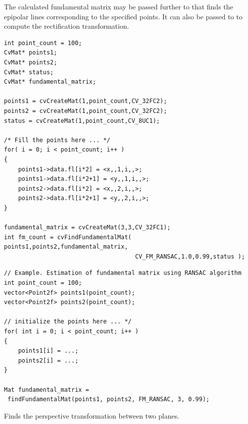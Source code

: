 The calculated fundamental matrix may be passed further to
 that finds the epipolar lines
corresponding to the specified points. It can also be passed to  to compute the rectification transformation.

\ifC
\begin{lstlisting}
int point_count = 100;
CvMat* points1;
CvMat* points2;
CvMat* status;
CvMat* fundamental_matrix;

points1 = cvCreateMat(1,point_count,CV_32FC2);
points2 = cvCreateMat(1,point_count,CV_32FC2);
status = cvCreateMat(1,point_count,CV_8UC1);

/* Fill the points here ... */
for( i = 0; i < point_count; i++ )
{
    points1->data.fl[i*2] = <x,,1,i,,>;
    points1->data.fl[i*2+1] = <y,,1,i,,>;
    points2->data.fl[i*2] = <x,,2,i,,>;
    points2->data.fl[i*2+1] = <y,,2,i,,>;
}

fundamental_matrix = cvCreateMat(3,3,CV_32FC1);
int fm_count = cvFindFundamentalMat( points1,points2,fundamental_matrix,
                                     CV_FM_RANSAC,1.0,0.99,status );
\end{lstlisting}
\fi
\ifCpp
\begin{lstlisting}
// Example. Estimation of fundamental matrix using RANSAC algorithm
int point_count = 100;
vector<Point2f> points1(point_count);
vector<Point2f> points2(point_count);

// initialize the points here ... */
for( int i = 0; i < point_count; i++ )
{
    points1[i] = ...;
    points2[i] = ...;
}

Mat fundamental_matrix =
 findFundamentalMat(points1, points2, FM_RANSAC, 3, 0.99);
\end{lstlisting}
\fi

\ifCPy
{}
\else
{}
\fi
Finds the perspective transformation between two planes.

